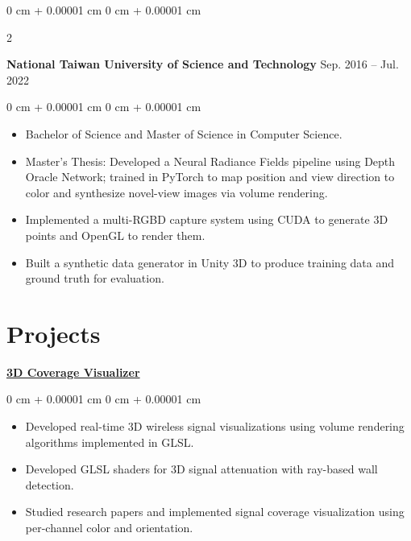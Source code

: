\documentclass[10pt, letterpaper]{article}
\newenvironment{highlights}{
    \begin{itemize}[
        topsep=0.10 cm,
        parsep=0.10 cm,
        partopsep=0pt,
        itemsep=0pt,
        leftmargin=0 cm + 10pt
    ]
}{
    \end{itemize}
} %
\newenvironment{onecolentry}{
    \begin{adjustwidth}{
        0 cm + 0.00001 cm
    }{
        0 cm + 0.00001 cm
    }
}{
    \end{adjustwidth}
} %
\newenvironment{twocolentry}[2][]{
    \onecolentry
    \def\secondColumn{#2}
    \setcolumnwidth{\fill, 4.5 cm}
    \begin{paracol}{2}
}{
    \switchcolumn \raggedleft \secondColumn
    \end{paracol}
    \endonecolentry
} %
\begin{document}
     \begin{twocolentry}{
        Sep. 2016 – Jul. 2022
    }
        \textbf{National Taiwan University of Science and Technology}\end{twocolentry}
    
    
    \vspace{0.10 cm}
    \begin{onecolentry}
        \begin{highlights}
            \item Bachelor of Science and Master of Science in Computer Science.
            \item Master’s Thesis: Developed a Neural Radiance Fields pipeline using Depth Oracle Network; trained in PyTorch to map position and view direction to color and synthesize novel-view images via volume rendering.
            \item Implemented a multi-RGBD capture system using CUDA to generate 3D points and OpenGL to render them.
            \item Built a synthetic data generator in Unity 3D to produce training data and ground truth for evaluation.
        \end{highlights}
    \end{onecolentry}
    
    
    \section{Projects}
        \href{https://github.com/tsengyushiang/coverage-visualizer}{\textbf{3D Coverage Visualizer}}

        \vspace{0.10 cm}
        \begin{onecolentry}
            \begin{highlights}
                \item Developed real-time 3D wireless signal visualizations using volume rendering algorithms implemented in GLSL.
                \item Developed GLSL shaders for 3D signal attenuation with ray-based wall detection.
                \item Studied research papers and implemented signal coverage visualization using per-channel color and orientation.
            \end{highlights}
        \end{onecolentry}

        \vspace{0.2 cm}
\end{document}
